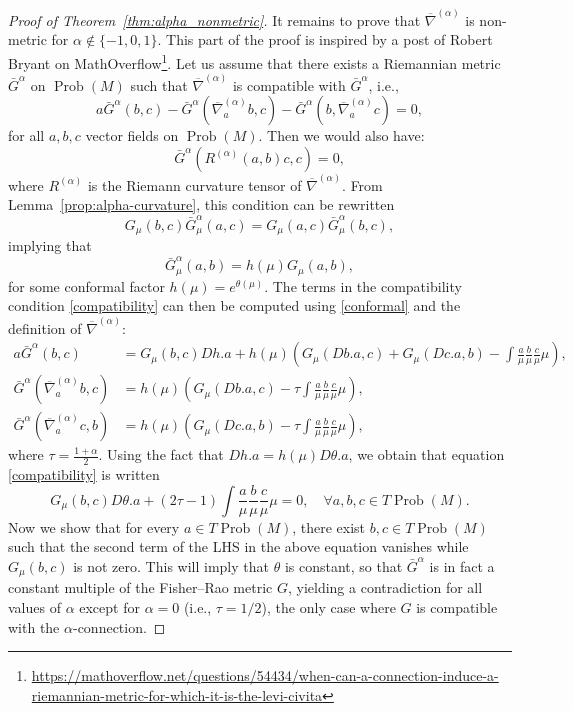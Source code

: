 \documentclass[11pt,reqno]{amsart}
\theoremstyle{definition}
\newcommand{\Prob}{\operatorname{Prob}(M)}
\newcommand{\GFR}{G}
\newcommand{\nabar}{\overline{\nabla}^{(\alpha)}}
\begin{document}
\begin{proof}[Proof of Theorem~\ref{thm:alpha_nonmetric}]
It remains to prove that $\nabar$ is non-metric for $\alpha\notin \{-1,0,1\}$. This part of the proof is inspired by a post of Robert Bryant on MathOverflow\footnote{\url{https://mathoverflow.net/questions/54434/when-can-a-connection-induce-a-riemannian-metric-for-which-it-is-the-levi-civita}}.
Let us assume that there exists a Riemannian metric $\bar G^{\alpha}$ on $\Prob$ such that $\nabar$ is compatible with $\bar G^\alpha$, i.e., 
\begin{equation}\label{compatibility}
a\bar G^\alpha(b,c)-\bar G^\alpha(\nabar_ab,c)-\bar G^\alpha(b,\nabar_ac)=0,
\end{equation}
for all $a,b,c$ vector fields on $\Prob$. Then we would also have:%
$$\bar G^\alpha(R^{(\alpha)}(a,b)c,c)=0,$$
where $R^{(\alpha)}$ is the Riemann curvature tensor of $\nabar$. From Lemma~\ref{prop:alpha-curvature}, this condition can be rewritten
$$\GFR_{\mu}(b,c)\bar G^\alpha_\mu(a,c)=\GFR_{\mu}(a,c)\bar G^\alpha_\mu(b,c),$$
implying that
\begin{equation}\label{conformal}
\bar G_\mu^\alpha(a,b)=h(\mu)G_\mu(a,b),
\end{equation}
for some conformal factor $h(\mu)=e^{\theta(\mu)}$. The terms in the compatibility condition \eqref{compatibility} can then be computed using \eqref{conformal} and the definition of $\nabar$:
\begin{align*}
a\bar G^\alpha(b,c)&=\GFR_{\mu}(b,c)Dh.a+h(\mu)\left(\GFR_{\mu}(Db.a,c)+\GFR_{\mu}(Dc.a,b)-\int\frac{a}{\mu}\frac{b}{\mu}\frac{c}{\mu}\mu\right),\\
\bar G^\alpha(\nabar_ab,c)&=h(\mu)\left(\GFR_{\mu}(Db.a,c)-\tau\int\frac{a}{\mu}\frac{b}{\mu}\frac{c}{\mu}\mu\right),\\
\bar G^\alpha(\nabar_ac,b)&=h(\mu)\left(\GFR_{\mu}(Dc.a,b)-\tau\int\frac{a}{\mu}\frac{b}{\mu}\frac{c}{\mu}\mu\right),
\end{align*}
where $\tau = \frac{1+\alpha}{2}$.
Using the fact that $Dh.a=h(\mu)D\theta.a$, we obtain that equation \eqref{compatibility} is written
$$\GFR_{\mu}(b,c)D\theta.a+\left(2\tau -1\right)\int\frac{a}{\mu}\frac{b}{\mu}\frac{c}{\mu}\mu=0,\quad\forall a,b,c\in T\Prob.$$
Now we show that for every $a\in T\Prob$, there exist $b,c\in T\Prob$ such that the second term of the LHS in the above equation vanishes while $\GFR_{\mu}(b,c)$ is not zero. This will imply that $\theta$ is constant, so that $\bar G^\alpha$ is in fact a constant multiple of the Fisher--Rao metric $\GFR$, yielding a contradiction for all values of $\alpha$ except for $\alpha=0$ (i.e., $\tau=1/2$), the only case where $\GFR$ is compatible with the $\alpha$-connection.


\end{proof}
\end{document}
